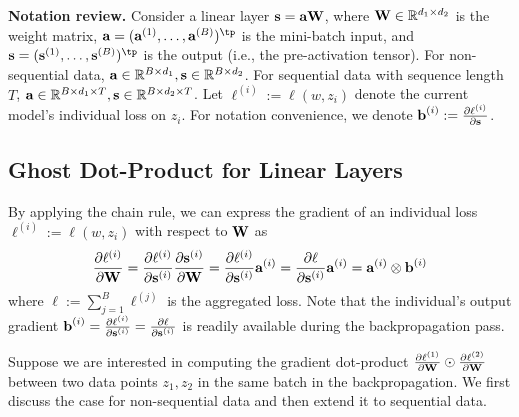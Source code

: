 \textbf{Notation review.} 
Consider a linear layer $\textbf{s} = \textbf{a} \textbf{W}$, where $\textbf{W} \in \mathbb{R}^{d_1 \times d_2}$ is the weight matrix, $\ba = (\ba^{(1)}, \ldots, \ba^{(B)})^\tp$ is the mini-batch input, and $\bs = (\bs^{(1)}, \ldots, \bs^{(B)})^{\tp}$ is the output (i.e., the pre-activation tensor). For non-sequential data, $\textbf{a} \in \mathbb{R}^{B \times d_1}, \textbf{s} \in \mathbb{R}^{B \times d_2}$. 
For sequential data with sequence length $T$, $\textbf{a} \in \mathbb{R}^{B \times d_1 \times T}, \textbf{s} \in \mathbb{R}^{B \times d_2 \times T}$. 
Let $\ell^{(i)} := \ell(w, z_i)$ denote the current model's individual loss on $z_i$. For notation convenience, we denote 
$
\textbf{b}^{(i)} := \frac{\partial \ell^{(i)}}{\partial \textbf{s}}
$. 

\subsection{Ghost Dot-Product for Linear Layers}
\label{appendix:efficiency-linear}

By applying the chain rule, we can express the gradient of an individual loss $\ell^{(i)} := \ell(w, z_i)$ with respect to $\textbf{W}$ as
\begin{align}
\frac{\partial \ell^{(i)}}{\partial \textbf{W}} =
\frac{\partial \ell^{(i)}}{\partial \textbf{s}^{(i)}}
\frac{\partial \textbf{s}^{(i)}}{\partial \textbf{W}}
= \frac{\partial \ell^{(i)} }{\partial \textbf{s}^{(i)}} \textbf{a}^{(i)}
= \frac{\partial \ell }{\partial \textbf{s}^{(i)}} \textbf{a}^{(i)}
= \textbf{a}^{(i)} \otimes \textbf{b}^{(i)}
\label{eq:linear-decompose}
\end{align}
where $\ell := \sum_{j=1}^B \ell^{(j)}$ is the aggregated loss. Note that the individual's output gradient $\textbf{b}^{(i)} = \frac{\partial \ell^{(i)}}{\partial \textbf{s}^{(i)}} = \frac{\partial \ell}{\partial \textbf{s}^{(i)}}$ is readily available during the backpropagation pass. 

Suppose we are interested in computing the gradient dot-product $\frac{\partial \ell^{(1)}}{\partial \textbf{W}} \odot \frac{\partial \ell^{(2)}}{\partial \textbf{W}}$ between two data points $z_1, z_2$ in the same batch in the backpropagation. We first discuss the case for non-sequential data and then extend it to sequential data. 

